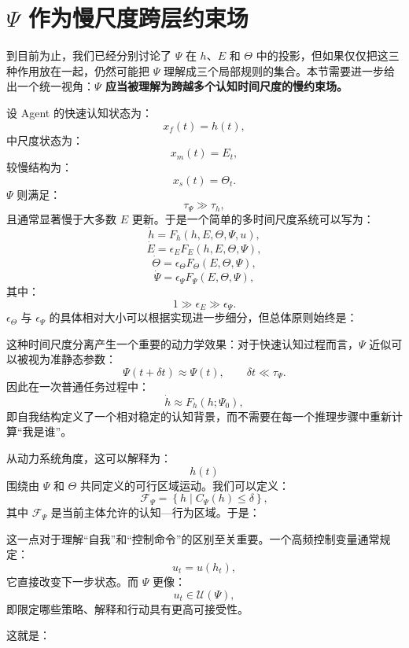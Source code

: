 \section{$\Psi$ 作为慢尺度跨层约束场}

到目前为止，我们已经分别讨论了 $\Psi$ 在 $h$、$E$ 和 $\Theta$ 中的投影，但如果仅仅把这三种作用放在一起，仍然可能把 $\Psi$ 理解成三个局部规则的集合。本节需要进一步给出一个统一视角：\textbf{$\Psi$ 应当被理解为跨越多个认知时间尺度的慢约束场。}

设 Agent 的快速认知状态为：
\[
x_f(t)=h(t),
\]
中尺度状态为：
\[
x_m(t)=E_t,
\]
较慢结构为：
\[
x_s(t)=\Theta_t.
\]
$\Psi$ 则满足：
\[
\tau_\Psi
\gg
\tau_h,
\]
且通常显著慢于大多数 $E$ 更新。于是一个简单的多时间尺度系统可以写为：
\[
\dot h
=
F_h
\left(
h,E,\Theta,\Psi,u
\right),
\]
\[
\dot E
=
\epsilon_E
F_E
\left(
h,E,\Theta,\Psi
\right),
\]
\[
\dot\Theta
=
\epsilon_\Theta
F_\Theta
\left(
E,\Theta,\Psi
\right),
\]
\[
\dot\Psi
=
\epsilon_\Psi
F_\Psi
\left(
E,\Theta,\Psi
\right),
\]
其中：
\[
1
\gg
\epsilon_E
\gg
\epsilon_\Psi.
\]
$\epsilon_\Theta$ 与 $\epsilon_\Psi$ 的具体相对大小可以根据实现进一步细分，但总体原则始终是：
\begin{statementbox}
\centering
{}
\end{statementbox}

这种时间尺度分离产生一个重要的动力学效果：对于快速认知过程而言，$\Psi$ 近似可以被视为准静态参数：
\[
\Psi(t+\delta t)
\approx
\Psi(t),
\qquad
\delta t\ll\tau_\Psi.
\]
因此在一次普通任务过程中：
\[
\dot h
\approx
F_h(h;\Psi_0),
\]
即自我结构定义了一个相对稳定的认知背景，而不需要在每一个推理步骤中重新计算“我是谁”。

从动力系统角度，这可以解释为：
\[
h(t)
\]
围绕由 $\Psi$ 和 $\Theta$ 共同定义的可行区域运动。我们可以定义：
\[
\mathcal F_\Psi
=
\left\{
h\mid
C_\Psi(h)\leq \delta
\right\},
\]
其中 $\mathcal F_\Psi$ 是当前主体允许的认知—行为区域。于是：
\begin{statementbox}
\centering
{}
\end{statementbox}

这一点对于理解“自我”和“控制命令”的区别至关重要。一个高频控制变量通常规定：
\[
u_t=u(h_t),
\]
它直接改变下一步状态。而 $\Psi$ 更像：
\[
u_t\in\mathcal U(\Psi),
\]
即限定哪些策略、解释和行动具有更高可接受性。

这就是：
\begin{statementbox}
\centering
{}
\end{statementbox}

